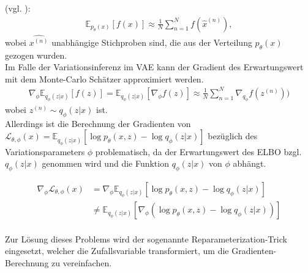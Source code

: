 \documentclass[%
thesis=student,%
coverpage=false,%
titlepage=false,%
headmarks=true, %
german,%
font=libertine, %
math=newpxtx, %
BCOR=5mm,%
coverBCOR=11mm%
]{tumbook}
\theoremstyle{break}
\begin{document}
(vgl. \cite{MonteCarloEstimation}): 
\begin{align}
	\mathbb{E}_{p_\theta(x)}[f(x)] \approx \frac{1}{N} \sum_{n=1}^{N}f(\hat{x}^{(n)}),
\end{align}
wobei $\hat{x^{(n)}}$ unabhängige Stichproben sind, die aus der Verteilung $p_\theta(x)$ gezogen wurden.\\
Im Falle der Variationsinferenz im VAE kann der Gradient des Erwartungswert mit dem Monte-Carlo Schätzer approximiert werden.\\
\begin{align}
	\nabla_\phi \mathbb{E}_{q_\phi(z|x)}[f(z)]= \mathbb{E}_{q_\phi(z|x)}[\nabla_{\phi} f(z)] \approx \frac{1}{N} \sum_{n=1}^{N}\nabla_{q_\phi}f(z^{(n)})) \label{MonteCarloEstimator}
\end{align}
wobei $z^{(n)} \sim q_\phi(z|x)$ ist.\\
Allerdings ist die Berechnung
der Gradienten von $\mathcal{L}_{\theta,\phi}(x) = \mathbb{E}_{q_\phi(z|x)}\left[\log p_\theta(x,z)- \log q_\phi(z|x)\right]$ bezüglich des Variationsparameters $\phi$ problematisch, da der Erwartungswert des ELBO bzgl. $q_\phi(z|x)$ genommen wird und die Funktion $q_\phi(z|x)$  von $\phi$ abhängt. 


\begin{align}
	\nabla_\phi \mathcal{L}_{\theta,\phi}(x) &= 	\nabla_\phi \mathbb{E}_{q_\phi(z|x)}\left[\log p_\theta(x,z)- \log q_\phi(z|x)\right] \\
	& \neq \mathbb{E}_{q_\phi(z|x)}\left[\nabla_\phi(\log p_\theta(x,z)- \log q_\phi(z|x))\right]
\end{align}
 \\
Zur Lösung dieses Problems wird der sogenannte Reparameterization-Trick eingesetzt, welcher die Zufallsvariable transformiert, um die Gradienten-Berechnung zu vereinfachen.  
\end{document}
